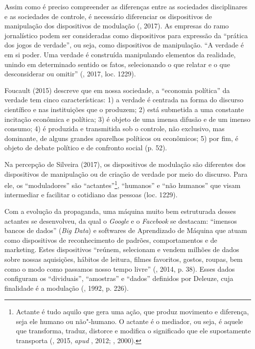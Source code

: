 Assim como é preciso compreender as diferenças entre as sociedades
disciplinares e as sociedades de controle, é necessário diferenciar os
dispositivos de manipulação dos dispositivos de modulação (,
2017). As empresas do ramo jornalístico podem ser consideradas como
dispositivos para expressão da ``prática dos jogos de verdade'', ou
seja, como dispositivos de manipulação. ``A verdade é em si poder. Uma
verdade é construída manipulando elementos da realidade, unindo em
determinado sentido os fatos, selecionando o que relatar e o que
desconsiderar ou omitir'' (, 2017, loc. 1229).

Foucault (2015) descreve que em nossa sociedade, a ``economia política''
da verdade tem cinco características: 1) a verdade é centrada na forma
do discurso científico e nas instituições que o produzem; 2) está
submetida a uma constante incitação econômica e política; 3) é objeto de
uma imensa difusão e de um imenso consumo; 4) é produzida e transmitida
sob o controle, não exclusivo, mas dominante, de alguns grandes
aparelhos políticos ou econômicos; 5) por fim, é objeto de debate
político e de confronto social (p. 52).

Na percepção de Silveira (2017), os dispositivos de modulação são
diferentes dos dispositivos de manipulação ou de criação de verdade por
meio do discurso. Para ele, os ``moduladores'' são
``actantes''\footnote{Actante é tudo aquilo que gera uma ação, que
  produz movimento e diferença, seja ele humano ou não"-humano. O actante
  é o mediador, ou seja, é aquele que transforma, traduz, distorce e
  modifica o significado que ele supostamente transporta (, 2015,
  \emph{apud} , 2012; , 2000).}, ``humanos'' e ``não humanos'' que
visam intermediar e facilitar o cotidiano das pessoas (loc. 1229).

Com a evolução da propaganda, uma máquina muito bem estruturada desses
actantes se desenvolveu, da qual o \emph{Google} e o \emph{Facebook} se
destacam: ``imensos bancos de dados'' (\emph{Big Data}) e softwares de
Aprendizado de Máquina que atuam como dispositivos de reconhecimento de
padrões, comportamentos e de marketing. Estes dispositivos ``reúnem,
selecionam e vendem milhões de dados sobre nossas aquisições, hábitos de
leitura, filmes favoritos, gostos, roupas, bem como o modo como passamos
nosso tempo livre'' (, 2014, p. 38). Esses dados configuram os
``dividuais'', ``amostras'' e ``dados'' definidos por Deleuze, cuja
finalidade é a modulação (, 1992, p. 226).

